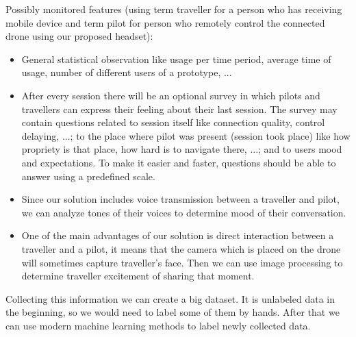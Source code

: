 Possibly monitored features (using term traveller for a person who has receiving mobile device and term pilot for person who remotely control the connected drone using our proposed headset):
\begin{itemize}
  \item General statistical observation like usage per time period, average time of usage, number of different users of a prototype, ...
  \item After every session there will be an optional survey in which pilots and travellers can express their feeling about their last session. The survey may contain questions related to session itself like connection quality, control delaying, ...; to the place where pilot was present (session took place) like how propriety is that place, how hard is to navigate there, ...; and to users mood and expectations. To make it easier and faster, questions should be able to answer using a predefined scale.
  \item Since our solution includes voice transmission between a traveller and pilot, we can analyze tones of their voices to determine mood of their conversation. 
  \item One of the main advantages of our solution is direct interaction between a traveller and a pilot, it means that the camera which is placed on the drone will sometimes capture traveller's face. Then we can use image processing to determine traveller excitement of sharing that moment. 
\end{itemize}

Collecting this information we can create a big dataset. It is unlabeled data in the beginning, so we would need to label some of them by hands. After that we can use modern machine learning methods to label newly collected data.